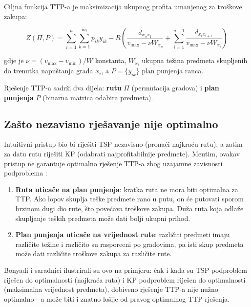 \documentclass[12pt,a4paper]{article}
\begin{document}
Ciljna funkcija TTP-a je maksimizacija ukupnog profita umanjenog za troškove zakupa:

\begin{equation}
    Z(\Pi, P) = \sum_{i=1}^{n} \sum_{k=1}^{m_i} p_{ik} y_{ik} - R \left( \frac{d_{x_n x_1}}{v_{\max} - \nu W_{x_n}} + \sum_{i=1}^{n-1} \frac{d_{x_i x_{i+1}}}{v_{\max} - \nu W_{x_i}} \right)
    \label{eq:objective}
\end{equation}

gdje je $\nu = (v_{\max} - v_{\min}) / W$ konstanta, $W_{x_i}$ ukupna te\v{z}ina predmeta skupljenih do trenutka napuštanja grada $x_i$, a $P = \{y_{ik}\}$ plan punjenja ranca.

Rje\v{s}enje TTP-a sadr\v{z}i dva dijela: \textbf{rutu} $\Pi$ (permutacija gradova) i \textbf{plan punjenja} $P$ (binarna matrica odabira predmeta).

\subsection{Zašto nezavisno rje\v{s}avanje nije optimalno}

Intuitivni pristup bio bi rije\v{s}iti TSP nezavisno (prona\'{c}i najkra\'{c}u rutu), a zatim za datu rutu rije\v{s}iti KP (odabrati najprofitabilnije predmete). Me\dj{}utim, ovakav pristup ne garantuje optimalno rje\v{s}enje TTP-a zbog uzajamne zavisnosti podproblema \cite{bonyadi2013,polyakovskiy2014}:

\begin{enumerate}
    \item \textbf{Ruta utica\v{c}e na plan punjenja}: kratka ruta ne mora biti optimalna za TTP. Ako lopov skuplja te\v{s}ke predmete rano u putu, on će putovati sporom brzinom dugi dio rute, što pove\'{c}ava troškove zakupa. Duža ruta koja odla\v{z}e skupljanje te\v{s}kih predmeta mo\v{z}e dati bolji ukupni prihod.
    \item \textbf{Plan punjenja utica\v{c}e na vrijednost rute}: razli\v{c}iti predmeti imaju razli\v{c}ite te\v{z}ine i razli\v{c}ito su raspore\dj{}eni po gradovima, pa isti skup predmeta mo\v{z}e dati razli\v{c}ite troškove zakupa za razli\v{c}ite rute.
\end{enumerate}

Bonyadi i saradnici \cite{bonyadi2013} ilustrirali su ovo na primjeru: \v{c}ak i kada su TSP podproblem rije\v{s}en do optimalnosti (najkra\'{c}a ruta) i KP podproblem rije\v{s}en do optimalnosti (maksimalna vrijednost predmeta), dobiveno rje\v{s}enje TTP-a nije nu\v{z}no optimalno---a mo\v{z}e biti i znatno lo\v{s}ije od pravog optimalnog TTP rje\v{s}enja.
\end{document}
